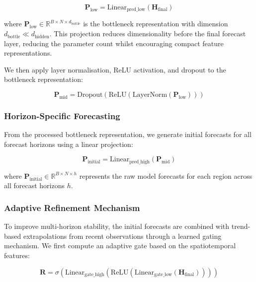 \documentclass[a4paper,fleqn]{cas-dc}
\begin{document}
\begin{equation}
\mathbf{P}_{\text{low}} = \text{Linear}_{\text{pred\_low}}(\mathbf{H}_{\text{final}})
\end{equation}

where $\mathbf{P}_{\text{low}} \in \mathbb{R}^{B \times N \times d_{\text{bottle}}}$ is the bottleneck representation with dimension $d_{\text{bottle}} \ll d_{\text{hidden}}$. This projection reduces dimensionality before the final forecast layer, reducing the parameter count whilst encouraging compact feature representations.

We then apply layer normalisation, ReLU activation, and dropout to the bottleneck representation:

\begin{equation}
\mathbf{P}_{\text{mid}} = \text{Dropout}(\text{ReLU}(\text{LayerNorm}(\mathbf{P}_{\text{low}})))
\end{equation}

\subsubsection{Horizon-Specific Forecasting}

From the processed bottleneck representation, we generate initial forecasts for all forecast horizons using a linear projection:

\begin{equation}
\mathbf{P}_{\text{initial}} = \text{Linear}_{\text{pred\_high}}(\mathbf{P}_{\text{mid}})
\end{equation}

where $\mathbf{P}_{\text{initial}} \in \mathbb{R}^{B \times N \times h}$ represents the raw model forecasts for each region across all forecast horizons $h$.

\subsubsection{Adaptive Refinement Mechanism}

To improve multi-horizon stability, the initial forecasts are combined with trend-based extrapolations from recent observations through a learned gating mechanism. We first compute an adaptive gate based on the spatiotemporal features:

\begin{equation}
\mathbf{R} = \sigma(\text{Linear}_{\text{gate\_high}}(\text{ReLU}(\text{Linear}_{\text{gate\_low}}(\mathbf{H}_{\text{final}}))))
\end{equation}
\end{document}
